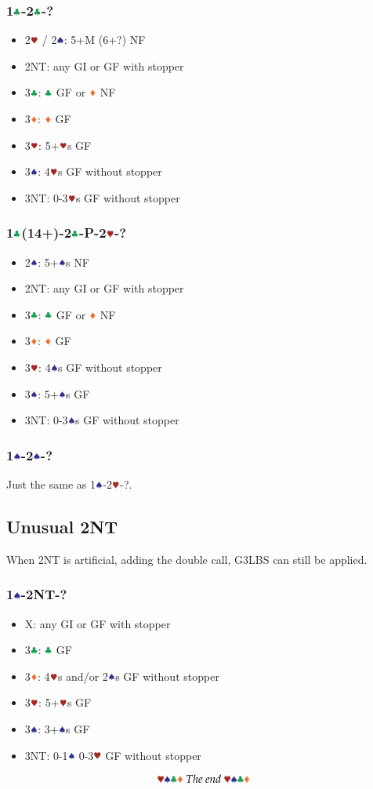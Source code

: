 \documentclass{article}
\begin{document}
\begin{multicols}{2}
\subsubsection{1$\ccc$-2$\ccc$-?}
\begin{itemize}
    \item 2$\hhh$ / 2$\sss$: 5+M (6+?) NF
    \item 2NT: any GI or GF with stopper
    \item 3$\ccc$: $\ccc$ GF or $\ddd$ NF
    \item 3$\ddd$: $\ddd$ GF
    \item 3$\hhh$: 5+$\hhh$s GF
    \item 3$\sss$: 4$\hhh$s GF without stopper
    \item 3NT: 0-3$\hhh$s GF without stopper
\end{itemize}

\subsubsection{1$\ccc$(14+)-2$\ccc$-P-2$\hhh$-?}
\begin{itemize}
    \item 2$\sss$: 5+$\sss$s NF
    \item 2NT: any GI or GF with stopper
    \item 3$\ccc$: $\ccc$ GF or $\ddd$ NF
    \item 3$\ddd$: $\ddd$ GF
    \item 3$\hhh$: 4$\sss$s GF without stopper
    \item 3$\sss$: 5+$\sss$s GF
    \item 3NT: 0-3$\sss$s GF without stopper
\end{itemize}

\subsubsection{1$\sss$-2$\sss$-?}
Just the same as 1$\sss$-2$\hhh$-?.

\subsection{Unusual 2NT}
When 2NT is artificial, adding the double call, G3LBS can still be applied.
\subsubsection{1$\sss$-2NT-?}
\begin{itemize}
    \item X: any GI or GF with stopper
    \item 3$\ccc$: $\ccc$ GF
    \item 3$\ddd$: 4$\hhh$s and/or 2$\sss$s GF without stopper
    \item 3$\hhh$: 5+$\hhh$s GF
    \item 3$\sss$: 3+$\sss$s GF
    \item 3NT: 0-1$\sss$ 0-3$\hhh$ GF without stopper
\end{itemize}

$$\hhh\sss\ccc\ddd~The~end~\hhh\sss\ccc\ddd$$

\end{multicols}
\end{document}
